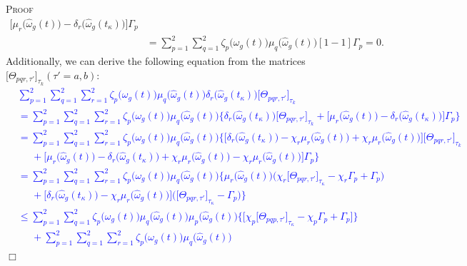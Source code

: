 \documentclass[preprint,11pt]{elsarticle}
\newenvironment{proof}{\noindent \textsc{Proof}\ }{\mbox{}\hfill $\Box$\\}
\begin{document}
\begin{proof}
\begin{align}
\Big[\mu_r\big(\hat{\omega}_g(t)\big)-\delta_r\big(\hat{\omega}_g(t_\kappa)\big)\Big]\Gamma_p\nonumber\\
&=\sum^{2}_{p=1}\sum^{2}_{q=1}\zeta_p\big(\omega_g(t)\big)\mu_q\big(\hat{\omega}_g(t)\big)
[1-1]\Gamma_p=0.\label{42}
\end{align}\vspace{-0.3cm}
Additionally, we can derive the following equation from the matrices $\big[ \Theta_{pqr,\tau'}  \big]_{\tau_k}(\tau'=a,b)$:
\textcolor{blue}{
\begin{align}
&\sum^{2}_{p=1}\sum^{2}_{q=1}\sum^{2}_{r=1}\zeta_p\big(\omega_g(t)\big)\mu_q\big(\hat{\omega}_g(t)\big)\delta_r\big(\hat{\omega}_g(t_\kappa)\big)
\big[ \Theta_{pqr,\tau'}  \big]_{\tau_k}\nonumber\\
&=\sum^{2}_{p=1}\sum^{2}_{q=1}\sum^{2}_{r=1}\zeta_p\big(\omega_g(t)\big)\mu_q\big(\hat{\omega}_g(t)\big)
\Bigg\{\delta_r\big(\hat{\omega}_g(t_\kappa)\big)
\big[ \Theta_{pqr,\tau'}  \big]_{\tau_k}
+\big[\mu_r\big(\hat{\omega}_g(t)\big)-\delta_r\big(\hat{\omega}_g(t_\kappa)\big)\big]\Gamma_p\Bigg\}\nonumber\\
&=\sum^{2}_{p=1}\sum^{2}_{q=1}\sum^{2}_{r=1}\zeta_p\big(\omega_g(t)\big)\mu_q\big(\hat{\omega}_g(t)\big)
\Bigg\{\Big[\delta_r\big(\hat{\omega}_g(t_\kappa)\big)-\chi_r\mu_r\big(\hat{\omega}_g(t)\big)+\chi_r\mu_r\big(\hat{\omega}_g(t)\big)\Big]
\big[ \Theta_{pqr,\tau'}  \big]_{\tau_k}\nonumber\\
&\;\;\;\;\;+\Big[\mu_r\big(\hat{\omega}_g(t)\big)-\delta_r\big(\hat{\omega}_g(t_\kappa)\big)
+\chi_r\mu_r\big(\hat{\omega}_g(t)\big)-\chi_r\mu_r\big(\hat{\omega}_g(t)\big)\Big]\Gamma_p\Bigg\}\nonumber\\
&=\sum^{2}_{p=1}\sum^{2}_{q=1}\sum^{2}_{r=1}\zeta_p\big(\omega_g(t)\big)\mu_q\big(\hat{\omega}_g(t)\big)
\Bigg\{\mu_r\big(\hat{\omega}_g(t)\big)\Big( \chi_r\big[ \Theta_{pqr,\tau'}\big]_{\tau_\kappa} -\chi_r\Gamma_p+ \Gamma_p\Big)\nonumber\\
&\;\;\;\;\;+\big[\delta_r\big(\hat{\omega}_g(t_\kappa)\big)-\chi_r\mu_r\big(\hat{\omega}_g(t)\big)\big]
\Big( \big[ \Theta_{pqr,\tau'}\big]_{\tau_\kappa} - \Gamma_p\Big)\Bigg\}\nonumber\\
&\leq\sum^{2}_{p=1}\sum^{2}_{q=1}\zeta_p\big(\omega_g(t)\big)\mu_q\big(\hat{\omega}_g(t)\big)\mu_p\big(\hat{\omega}_g(t)\big)
\Big\{\big[ \chi_p\big[ \Theta_{pqp,\tau'}\big]_{\tau_\kappa} -\chi_p\Gamma_p+ \Gamma_p\big]\Big\}\nonumber\\
&\;\;\;\;\;+\sum^{2}_{p=1}\sum^{2}_{q=1}\sum^{2}_{r=1}\zeta_p\big(\omega_g(t)\big)\mu_q\big(\hat{\omega}_g(t)\big)

\end{align}}
\end{proof}
\end{document}
